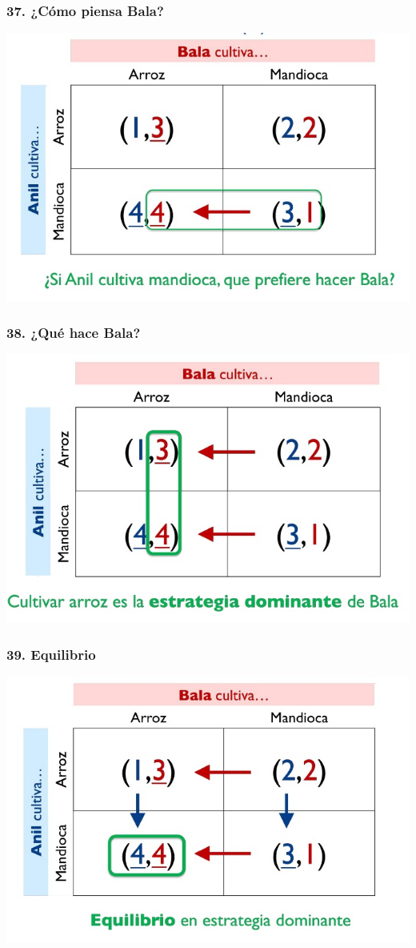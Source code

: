 \documentclass[14pt]{beamer}
\begin{document}
\begin{frame}
\frametitle{37. ¿Cómo piensa Bala?}
\centering
\includegraphics[scale=0.6]{Figures/Tema_03_17_bala.jpg}
\end{frame}

\begin{frame}
\frametitle{38. ¿Qué hace Bala?}
\centering
\includegraphics[scale=0.6]{Figures/Tema_03_18_bala.jpg}
\end{frame}

\begin{frame}
\frametitle{39. Equilibrio}
\centering
\includegraphics[scale=0.6]{Figures/Tema_03_19_bala.jpg}
\end{frame}
\end{document}
